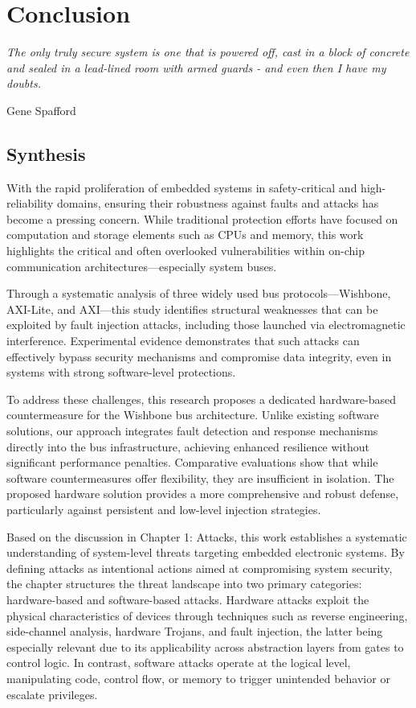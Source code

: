\chapter{Conclusion}
\label{chapter:conclusion}

\epigraph{\textit{The only truly secure system is one that is powered off, cast in a block of concrete and sealed in a lead-lined room with armed guards - and even then I have my doubts.}}{Gene Spafford}

\minitoc

\section{Synthesis}
With the rapid proliferation of embedded systems in safety-critical and high-reliability domains, ensuring their robustness against faults and attacks has become a pressing concern. While traditional protection efforts have focused on computation and storage elements such as CPUs and memory, this work highlights the critical and often overlooked vulnerabilities within on-chip communication architectures—especially system buses.

Through a systematic analysis of three widely used bus protocols—Wishbone, AXI-Lite, and AXI—this study identifies structural weaknesses that can be exploited by fault injection attacks, including those launched via electromagnetic interference. Experimental evidence demonstrates that such attacks can effectively bypass security mechanisms and compromise data integrity, even in systems with strong software-level protections.

To address these challenges, this research proposes a dedicated hardware-based countermeasure for the Wishbone bus architecture. Unlike existing software solutions, our approach integrates fault detection and response mechanisms directly into the bus infrastructure, achieving enhanced resilience without significant performance penalties. Comparative evaluations show that while software countermeasures offer flexibility, they are insufficient in isolation. The proposed hardware solution provides a more comprehensive and robust defense, particularly against persistent and low-level injection strategies.

Based on the discussion in Chapter 1: Attacks, this work establishes a systematic understanding of system-level threats targeting embedded electronic systems. By defining attacks as intentional actions aimed at compromising system security, the chapter structures the threat landscape into two primary categories: hardware-based and software-based attacks. Hardware attacks exploit the physical characteristics of devices through techniques such as reverse engineering, side-channel analysis, hardware Trojans, and fault injection, the latter being especially relevant due to its applicability across abstraction layers from gates to control logic. In contrast, software attacks operate at the logical level, manipulating code, control flow, or memory to trigger unintended behavior or escalate privileges.

